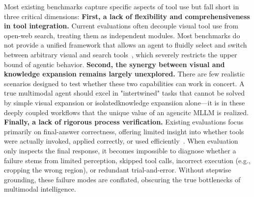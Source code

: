 \documentclass[runningheads]{llncs}
\theoremstyle{plain}
\theoremstyle{definition}
\theoremstyle{remark}
\begin{document}
Most existing benchmarks capture specific aspects of tool use but fall short in three critical dimensions: \textbf{First, a lack of flexibility and comprehensiveness in tool integration.} Current evaluations often decouple visual tool use from open-web search, treating them as independent modules. Most benchmarks do not provide a unified framework that allows an agent to fluidly select and switch between arbitrary visual and search tools~\cite{li2025tir,guo2025beyond,li2025mm,tao2025mmsearch,froger2026gaia2,zhang2026adaptmmbench}, which severely restricts the upper bound of agentic behavior. \textbf{Second, the synergy between visual and knowledge expansion remains largely unexplored.} There are few realistic scenarios designed to test whether these two capabilities can work in concert. A true multimodal agent should excel in "intertwined" tasks that cannot be solved by simple visual expansion or isolatedknowledge expansiion alone—it is in these deeply coupled workflows that the unique value of an agencitc MLLM is realized. \textbf{Finally, a lack of rigorous process verification.} Existing evaluations focus primarily on final-answer correctness, offering limited insight into whether tools were actually invoked, applied correctly, or used efficiently~\cite{hou2025codev}. When evaluation only inspects the final response, it becomes impossible to diagnose whether a failure stems from limited perception, skipped tool calls, incorrect execution (e.g., cropping the wrong region), or redundant trial-and-error. Without stepwise grounding, these failure modes are conflated, obscuring the true bottlenecks of multimodal intelligence.
\end{document}
